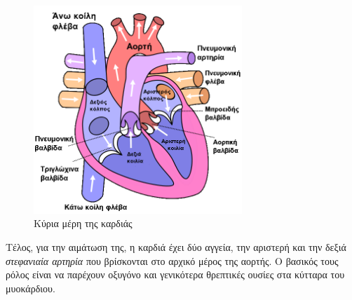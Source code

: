 \begin{figure}[H]
    \centering
    \includegraphics[width=0.7\textwidth]{misc/valves_of_heart.png}
    \caption{Κύρια μέρη της καρδιάς}
    \label{fig:2.2}
\end{figure}
\noindent Τέλος, για την αιμάτωση της, η καρδιά έχει δύο αγγεία, την αριστερή και την δεξιά \emph{στεφανιαία αρτηρία} που βρίσκονται στο αρχικό μέρος της αορτής. Ο βασικός τους ρόλος είναι να παρέχουν οξυγόνο και γενικότερα θρεπτικές ουσίες στα κύτταρα του μυοκάρδιου.
